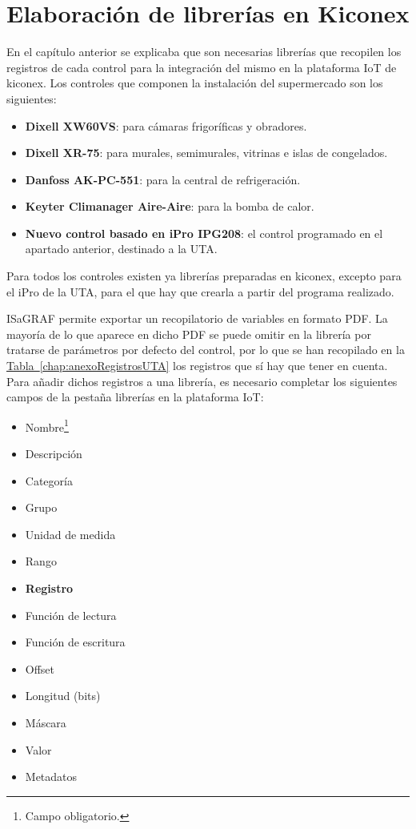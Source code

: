 \section{Elaboración de librerías en Kiconex}
\label{sec:librerias}
En el capítulo anterior se explicaba que son necesarias librerías que recopilen los registros de cada control para la integración del mismo en la plataforma IoT de kiconex. Los controles que componen la instalación del supermercado son los siguientes:

\begin{itemize}
  \item \textbf{Dixell XW60VS}: para cámaras frigoríficas y obradores.
  \item \textbf{Dixell XR-75}: para murales, semimurales, vitrinas e islas de congelados.
  \item \textbf{Danfoss AK-PC-551}: para la central de refrigeración.
  \item \textbf{Keyter Climanager Aire-Aire}: para la bomba de calor.
  \item \textbf{Nuevo control basado en iPro IPG208}: el control programado en el apartado anterior, destinado a la UTA.
\end{itemize}

Para todos los controles existen ya librerías preparadas en kiconex, excepto para el iPro de la UTA, para el que hay que crearla a partir del programa realizado. 

ISaGRAF permite exportar un recopilatorio de variables en formato PDF. La mayoría de lo que aparece en dicho PDF se puede omitir en la librería por tratarse de parámetros por defecto del control, por lo que se han recopilado en la \hyperref[chap:anexoRegistrosUTA]{Tabla~\ref{chap:anexoRegistrosUTA}} los registros que sí hay que tener en cuenta. Para añadir dichos registros a una librería, es necesario completar los siguientes campos de la pestaña librerías en la plataforma IoT:

\begin{itemize}
  \item Nombre\footnote[1]{Campo obligatorio.}
  \item Descripción\footnotemark[1]
  \item Categoría\footnotemark[1]
  \item Grupo
  \item Unidad de medida
  \item Rango
  \item \textbf{Registro\footnotemark[1]}
  \item Función de lectura
  \item Función de escritura
  \item Offset
  \item Longitud (bits)\footnotemark[1]
  \item Máscara
  \item Valor
  \item Metadatos
\end{itemize}


